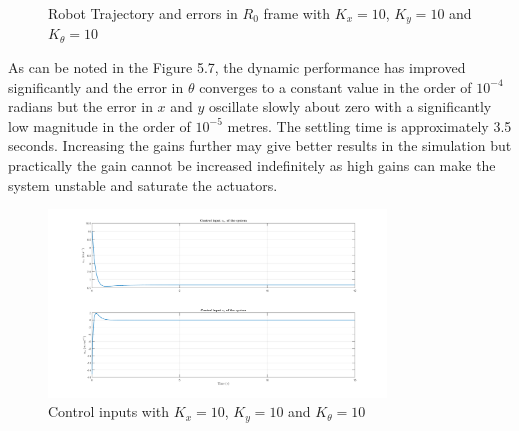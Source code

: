 \documentclass{article}
\begin{document}
\begin{itemize}
\begin{figure}[H]
\caption{Robot Trajectory and errors in $R_{0}$ frame with $K_{x}=10$, $K_{y}=10$ and $K_{\theta}=10$ }
\label{fig:figure8}
\end{figure}
As can be noted in the Figure 5.7, the dynamic performance has improved significantly and the error in $\theta$ converges to a constant value in the order of $10^{-4}$ radians but the error in $x$ and $y$ oscillate slowly about zero with a significantly low magnitude in the order of $10^{-5}$ metres. The settling time is approximately 3.5 seconds. Increasing the gains further may give better results in the simulation but practically the gain cannot be increased indefinitely as high gains can make the system unstable and saturate the actuators. 
\begin{figure}[H]
\centering
\includegraphics[width = 0.8\textwidth]{Figures/figure9.png}
\caption{Control inputs with $K_{x}=10$, $K_{y}=10$ and $K_{\theta}=10$ }
\label{fig:figure9}
\end{figure}
\end{itemize}
\end{document}
